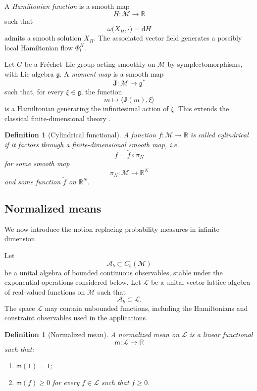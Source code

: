 \documentclass[10pt,a4paper]{amsart}
\newtheorem{Definition}[Theorem]{Definition}
\begin{document}
A \emph{Hamiltonian function} is a smooth map
\[
H\colon\mathcal M\longrightarrow\mathbb R
\]
such that
\begin{equation}
\omega\bigl(X_H,\cdot\bigr)=\mathrm dH
\label{eq:Hamiltonian}
\end{equation}
admits a smooth solution $X_H$. The associated vector field generates a
possibly local Hamiltonian flow $\Phi_t^H$.

Let $G$ be a Fréchet--Lie group acting smoothly on $\mathcal M$ by
symplectomorphisms, with Lie algebra $\mathfrak g$. A \emph{moment map}
is a smooth map
\[
\mathbf J\colon\mathcal M\longrightarrow\mathfrak g^*
\]
such that, for every $\xi\in\mathfrak g$, the function
\[
m\longmapsto\langle\mathbf J(m),\xi\rangle
\]
is a Hamiltonian generating the infinitesimal action of $\xi$. This
extends the classical finite-dimensional theory
\cite{AbrahamMarsden78,MarsdenRatiu99,Omori97}.

\begin{Definition}[Cylindrical functional]
A function $f\colon\mathcal M\to\mathbb R$ is called cylindrical if it
factors through a finite-dimensional smooth map, i.e.
\[
f=\widetilde f\circ\pi_N
\]
for some smooth map
\[
\pi_N\colon\mathcal M\longrightarrow\mathbb R^N
\]
and some function $\widetilde f$ on $\mathbb R^N$.
\end{Definition}

\subsection{Normalized means}

We now introduce the notion replacing probability measures in infinite
dimension.

Let
\[
\mathcal A_b\subset C_b(\mathcal M)
\]
be a unital algebra of bounded continuous observables, stable under the
exponential operations considered below. Let $\mathcal L$ be a unital
vector lattice algebra of real-valued functions on $\mathcal M$ such
that
\[
\mathcal A_b\subset\mathcal L.
\]
The space $\mathcal L$ may contain unbounded functions, including the
Hamiltonians and constraint observables used in the applications.

\begin{Definition}[Normalized mean]
\label{def:normalized-mean}
A \emph{normalized mean} on $\mathcal L$ is a linear functional
\[
\mathsf m\colon\mathcal L\longrightarrow\mathbb R
\]
such that:
\begin{enumerate}
\item[\textup{(i)}] $\mathsf m(1)=1$;
\item[\textup{(ii)}] $\mathsf m(f)\geq 0$ for every $f\in\mathcal L$
such that $f\geq 0$.
\end{enumerate}
\end{Definition}
\end{document}
